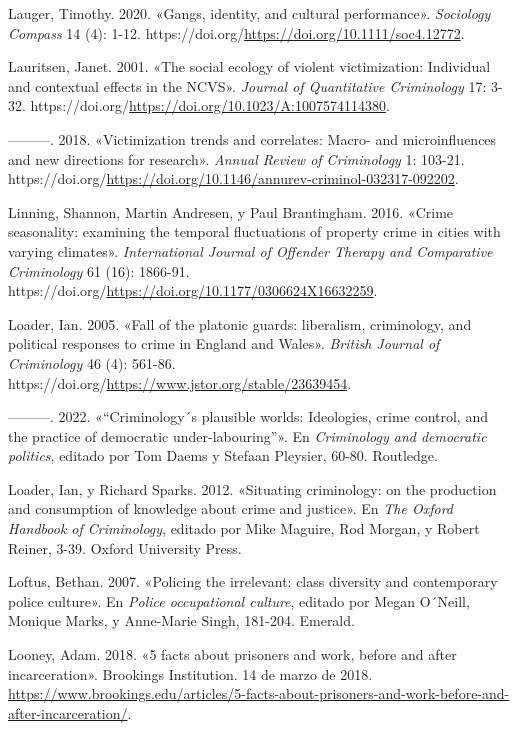 \documentclass[
  spanish,
  letterpaper,
  DIV=11,
  numbers=noendperiod]{scrreprt}
\newlength{\cslhangindent}
\newenvironment{CSLReferences}[2] %
 {\begin{list}{}{%
  \setlength{\itemindent}{0pt}
  \setlength{\leftmargin}{0pt}
  \setlength{\parsep}{0pt}
  \ifodd #1
   \setlength{\leftmargin}{\cslhangindent}
   \setlength{\itemindent}{-1\cslhangindent}
  \fi
  \setlength{\itemsep}{#2\baselineskip}}}
 {\end{list}}
\begin{document}
\begin{CSLReferences}{1}{0}
Lauger, Timothy. 2020. {«Gangs, identity, and cultural performance»}.
\emph{Sociology Compass} 14 (4): 1-12.
https://doi.org/\url{https://doi.org/10.1111/soc4.12772}.

Lauritsen, Janet. 2001. {«The social ecology of violent victimization:
Individual and contextual effects in the NCVS»}. \emph{Journal of
Quantitative Criminology} 17: 3-32.
https://doi.org/\url{https://doi.org/10.1023/A:1007574114380}.

---------. 2018. {«Victimization trends and correlates: Macro- and
microinfluences and new directions for research»}. \emph{Annual Review
of Criminology} 1: 103-21.
https://doi.org/\url{https://doi.org/10.1146/annurev-criminol-032317-092202}.

Linning, Shannon, Martin Andresen, y Paul Brantingham. 2016. {«Crime
seasonality: examining the temporal fluctuations of property crime in
cities with varying climates»}. \emph{International Journal of Offender
Therapy and Comparative Criminology} 61 (16): 1866-91.
https://doi.org/\url{https://doi.org/10.1177/0306624X16632259}.

Loader, Ian. 2005. {«Fall of the platonic guards: liberalism,
criminology, and political responses to crime in England and Wales»}.
\emph{British Journal of Criminology} 46 (4): 561-86.
https://doi.org/\url{https://www.jstor.org/stable/23639454}.

---------. 2022. {«{``Criminology´s plausible worlds: Ideologies, crime
control, and the practice of democratic under-labouring''}»}. En
\emph{Criminology and democratic politics}, editado por Tom Daems y
Stefaan Pleysier, 60-80. Routledge.

Loader, Ian, y Richard Sparks. 2012. {«Situating criminology: on the
production and consumption of knowledge about crime and justice»}. En
\emph{The Oxford Handbook of Criminology}, editado por Mike Maguire, Rod
Morgan, y Robert Reiner, 3-39. Oxford University Press.

Loftus, Bethan. 2007. {«Policing the irrelevant: class diversity and
contemporary police culture»}. En \emph{Police occupational culture},
editado por Megan O´Neill, Monique Marks, y Anne-Marie Singh, 181-204.
Emerald.

Looney, Adam. 2018. {«5 facts about prisoners and work, before and after
incarceration»}. Brookings Institution. 14 de marzo de 2018.
\url{https://www.brookings.edu/articles/5-facts-about-prisoners-and-work-before-and-after-incarceration/}.


\end{CSLReferences}
\end{document}

